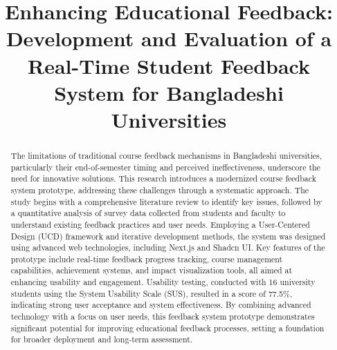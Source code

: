 \documentclass[conference]{IEEEtran}
\begin{document}
\title{Enhancing Educational Feedback: Development and Evaluation of a Real-Time Student Feedback System for Bangladeshi Universities\\


}

\author{
\and
{}
\and
{}
\and
{}
}

\maketitle

\begin{abstract}
    The limitations of traditional course feedback mechanisms in Bangladeshi universities, particularly their end-of-semester timing and perceived ineffectiveness, underscore the need for innovative solutions. This research introduces a modernized course feedback system prototype, addressing these challenges through a systematic approach. The study begins with a comprehensive literature review to identify key issues, followed by a quantitative analysis of survey data collected from students and faculty to understand existing feedback practices and user needs. Employing a User-Centered Design (UCD) framework and iterative development methods, the system was designed using advanced web technologies, including Next.js and Shadcn UI. Key features of the prototype include real-time feedback progress tracking, course management capabilities, achievement systems, and impact visualization tools, all aimed at enhancing usability and engagement. Usability testing, conducted with 16 university students using the System Usability Scale (SUS), resulted in a score of 77.5\%, indicating strong user acceptance and system effectiveness. By combining advanced technology with a focus on user needs, this feedback system prototype demonstrates significant potential for improving educational feedback processes, setting a foundation for broader deployment and long-term assessment.
    \end{abstract}
    
\end{document}
